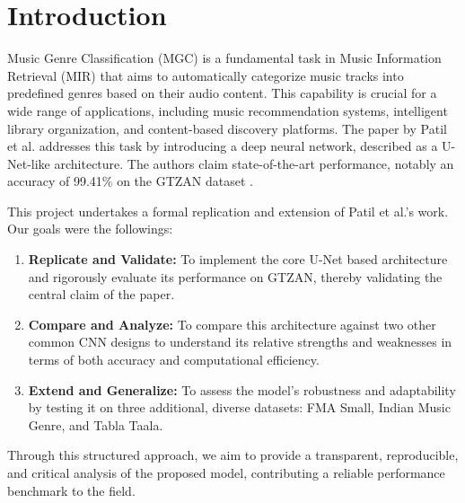 \documentclass[11pt,a4paper]{article}
\begin{document}



\section{Introduction}
\label{sec:introduction}
Music Genre Classification (MGC) is a fundamental task in Music Information Retrieval (MIR) that aims to automatically categorize music tracks into predefined genres based on their audio content. This capability is crucial for a wide range of applications, including music recommendation systems, intelligent library organization, and content-based discovery platforms. The paper by Patil et al. \cite{patil} addresses this task by introducing a deep neural network, described as a U-Net-like architecture. The authors claim state-of-the-art performance, notably an accuracy of 99.41\% on the GTZAN dataset \textbf{\cite{tzanetakis2002gtzan}}. %

This project undertakes a formal replication and extension of Patil et al.'s work. Our goals were the followings:
\begin{enumerate}
    \item \textbf{Replicate and Validate:} To implement the core U-Net based architecture and rigorously evaluate its performance on GTZAN, thereby validating the central claim of the paper.
    \item \textbf{Compare and Analyze:} To compare this architecture against two other common CNN designs to understand its relative strengths and weaknesses in terms of both accuracy and computational efficiency.
    \item \textbf{Extend and Generalize:} To assess the model's robustness and adaptability by testing it on three additional, diverse datasets: FMA Small, Indian Music Genre, and Tabla Taala.
\end{enumerate}
Through this structured approach, we aim to provide a transparent, reproducible, and critical analysis of the proposed model, contributing a reliable performance benchmark to the field.
\end{document}
